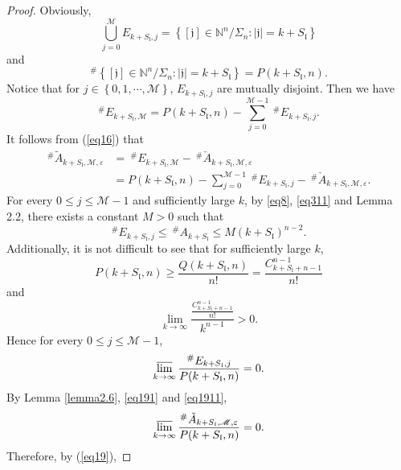 \documentclass[11pt]{article}
\theoremstyle{plain}
\theoremstyle{definition}
\begin{document}
\begin{proof}
Obviously,
$$
\bigcup_{j=0}^{\mathscr{M} }  E_{k+S_\mathfrak{l} ,j}  =\left \{ [\mathfrak{j}]\in \mathbb N^n/\Sigma_n : \left | \mathfrak{j}\right |=k+S_\mathfrak{l}   \right \}
$$
and
 $$
 ^{\#  } \left \{ [\mathfrak{j}]\in\mathbb N^n/\Sigma_n : \left | \mathfrak{j} \right |=k+S_\mathfrak{l}  \right \}  =P(k+S_\mathfrak{l}, n).
 $$
	Notice that for $j\in \left \{ 0,1,\cdots,\mathscr{M} \right \} $, $E_{k+S_\mathfrak{l}, j}$ are mutually disjoint. Then we have
	\begin{equation}\label{eq18}
		^{\#  }E_{k+S_\mathfrak{l},\mathscr{M}}   = P(k+S_\mathfrak{l},n) - \sum\limits_{j=0}^{\mathscr{M}-1} \  ^{\#  }E_{k+S_\mathfrak{l},j}     .
	\end{equation}
	It follows from (\ref{eq16}) that
	\begin{equation}\label{eq19}
		\begin{aligned}
			^{\#  } \tilde{A}_{k+S_\mathfrak{l},\mathscr{M},\varepsilon }
			  &= \ ^{\#  }E_{k+S_\mathfrak{l},\mathscr{M}}   - \ ^{\#  } \check{A}_{k+S_\mathfrak{l},\mathscr{M},\varepsilon }
			\\&=  P(k+S_\mathfrak{l},n) - \sum\limits_{j=0}^{\mathscr{M}-1}\  ^{\#  }E_{k+S_\mathfrak{l},j} - \ ^{\#  } \check{A}_{k+S_\mathfrak{l},\mathscr{M},\varepsilon }.
		\end{aligned}
	\end{equation}
	For every $0 \le j \le \mathscr{M}-1$ and sufficiently large $k$, by \eqref{eq8}, \eqref{eq311} and Lemma 2.2, there exists a constant $M>0$ such that
	$$^{\#  } E_{k+S_\mathfrak{l},j}   \le \ ^{\#  } A_{k+S_\mathfrak{l}} \le M\left ( k+S_\mathfrak{l}\right ) ^{n-2}.$$
	Additionally, it is not difficult to see that for sufficiently large $k$,
	\begin{equation}\label{eq191} P(k+S_\mathfrak{l},n) \ge \frac{Q(k+S_\mathfrak{l},n)}{n!} = \frac{C_{k+S_\mathfrak{l}+n-1}^{n-1}}{n!}\end{equation}
    and
    \begin{equation}\label{eq1911}\lim\limits_{k \to \infty} \frac{\frac{C_{k+S_\mathfrak{l}+n-1}^{n-1}}{n!}}{k^{n-1}} > 0.\end{equation}
	Hence for every $0 \le j \le \mathscr{M}-1$,
	$$\varlimsup_{k\to \infty} \frac{^{\#  } E_{k+S_{\mathfrak{l}},j}  }{P(k+S_{\mathfrak{l}},n)}=0.$$
	By Lemma \ref{lemma2.6}, \eqref{eq191} and \eqref{eq1911},
	$$\varlimsup_{k\to \infty} \frac{^{\#  } \check{A}_{k+S_{\mathfrak{l}},\mathscr{M},\varepsilon }  }{P(k+S_{\mathfrak{l}},n)} = 0.$$
	Therefore, by (\ref{eq19}),

\end{proof}
\end{document}
